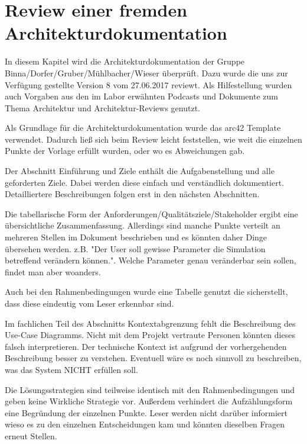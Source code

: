 
\chapter{Review einer fremden Architekturdokumentation}
\label{Review_einer_fremden_Architekturdokumentation}

\thispagestyle{standard}
\pagestyle{standard}

In diesem Kapitel wird die Architekturdokumentation der Gruppe Binna/Dorfer/Gruber/Mühlbacher/Wieser überprüft.
Dazu wurde die uns zur Verfügung gestellte Version 8 vom 27.06.2017 reviewt. Als Hilfestellung wurden auch Vorgaben aus den im Labor erwähnten Podcasts und Dokumente zum Thema Architektur und Architektur-Reviews genutzt.

Als Grundlage für die Architekturdokumentation wurde das arc42 Template verwendet. Dadurch ließ sich beim Review leicht feststellen, wie weit die einzelnen Punkte der Vorlage erfüllt wurden, oder wo es Abweichungen gab.


Der Abschnitt Einführung und Ziele enthält die Aufgabenstellung und alle geforderten Ziele. Dabei werden diese einfach und verständlich dokumentiert. Detailliertere Beschreibungen folgen erst in den nächsten Abschnitten.


Die tabellarische Form der Anforderungen/Qualitätsziele/Stakeholder ergibt eine übersichtliche Zusammenfassung. Allerdings sind manche Punkte verteilt an mehreren Stellen im Dokument beschrieben und es könnten daher Dinge übersehen werden. z.B. "Der User soll gewisse Parameter die Simulation betreffend verändern können.". Welche Parameter genau veränderbar sein sollen, findet man aber woanders.


Auch bei den Rahmenbedingungen wurde eine Tabelle genutzt die sicherstellt, dass diese eindeutig vom Leser erkennbar sind.


Im fachlichen Teil des Abschnitts Kontextabgrenzung fehlt die Beschreibung des Use-Case Diagramms. Nicht mit dem Projekt vertraute Personen könnten dieses falsch interpretieren. Der technische Kontext ist aufgrund der vorhergehenden Beschreibung besser zu verstehen. Eventuell wäre es noch sinnvoll zu beschreiben, was das System NICHT erfüllen soll.


Die Lösungsstrategien sind teilweise identisch mit den Rahmenbedingungen und geben keine Wirkliche Strategie vor.
Außerdem verhindert die Aufzählungsform eine Begründung der einzelnen Punkte. Leser werden nicht darüber informiert wieso es zu den einzelnen Entscheidungen kam und könnten dieselben Fragen erneut Stellen.


